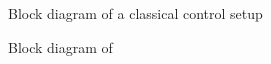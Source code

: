 

\begin{figure}[H]
	
	\caption{Block diagram of a classical control setup}
	\label{classicalControl}
\end{figure}

\begin{figure}[H]
	
	\caption{Block diagram of}
	\label{Parameters}
\end{figure}